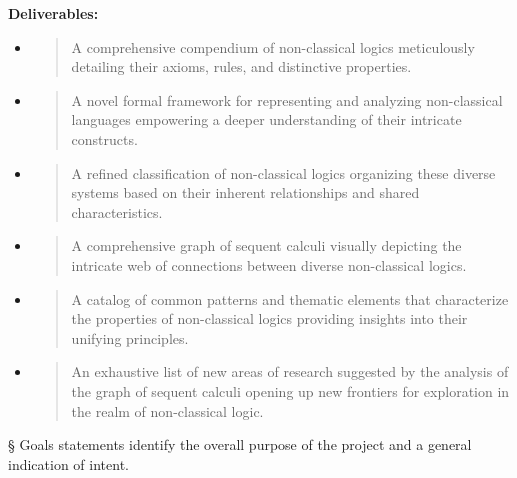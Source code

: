 \textbf{Deliverables:}

\begin{itemize}
\item
  \begin{quote}
  A comprehensive compendium of non-classical logics meticulously
  detailing their axioms, rules, and distinctive properties.
  \end{quote}
\item
  \begin{quote}
  A novel formal framework for representing and analyzing non-classical
  languages empowering a deeper understanding of their intricate
  constructs.
  \end{quote}
\item
  \begin{quote}
  A refined classification of non-classical logics organizing these
  diverse systems based on their inherent relationships and shared
  characteristics.
  \end{quote}
\item
  \begin{quote}
  A comprehensive graph of sequent calculi visually depicting the
  intricate web of connections between diverse non-classical logics.
  \end{quote}
\item
  \begin{quote}
  A catalog of common patterns and thematic elements that characterize
  the properties of non-classical logics providing insights into their
  unifying principles.
  \end{quote}
\item
  \begin{quote}
  An exhaustive list of new areas of research suggested by the analysis
  of the graph of sequent calculi opening up new frontiers for
  exploration in the realm of non-classical logic.
  \end{quote}
\end{itemize}

§ Goals statements identify the overall purpose of the project and a
general indication of intent.

